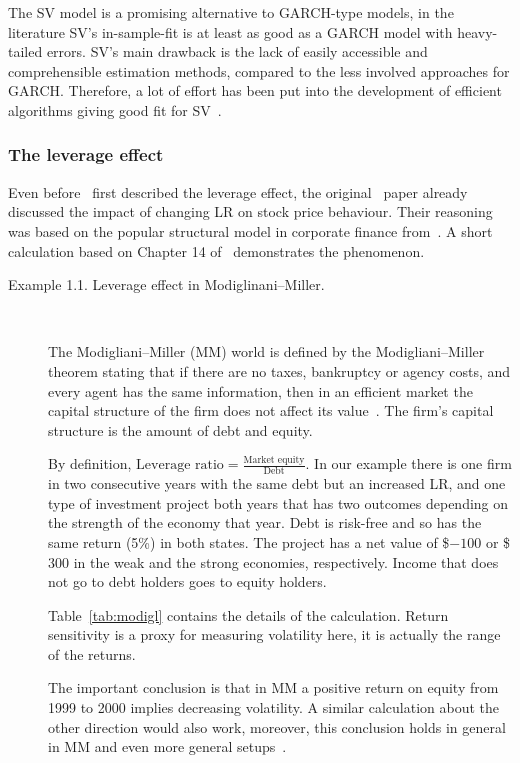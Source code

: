 The SV model is a promising alternative to GARCH-type models, in the literature SV's in-sample-fit is at least as good as a GARCH model with heavy-tailed errors.
SV's main drawback is the lack of easily accessible and comprehensible estimation methods, compared to the less involved approaches for GARCH.
Therefore, a lot of effort has been put into the development of efficient algorithms giving good fit for SV~\citep{Kim1998,jacquier2002bayesian,Omori2007,Kastner2014,Chan2016}.

\subsubsection*{The leverage effect}

Even before~\citet{black1976studies} first described the leverage effect, the original~\citet{black1973pricing} paper already discussed the impact of changing LR on stock price behaviour.
Their reasoning was based on the popular structural model in corporate finance from~\citet{modigliani1958cost}.
A short calculation based on Chapter 14 of~\citet{berk2007corporate} demonstrates the phenomenon.
\begin{description}
	\item[Example 1.1. Leverage effect in Modiglinani--Miller.]~
	
	The Modigliani--Miller (MM) world is defined by the Modigliani--Miller theorem stating that if there are no taxes, bankruptcy or agency costs, and every agent has the same information, then in an efficient market the capital structure of the firm does not affect its value~\citep{modigliani1958cost}.
	The firm's capital structure is the amount of debt and equity.
	
	By definition, $\text{Leverage ratio}=\frac{\text{Market equity}}{\text{Debt}}$. In our example there is one firm in two consecutive years with the same debt but an increased LR, and one type of investment project both years that has two outcomes depending on the strength of the economy that year.
	Debt is risk-free and so has the same return (5\%) in both states.
	The project has a net value of \$$-100$ or \$$300$ in the weak and the strong economies, respectively.
	Income that does not go to debt holders goes to equity holders.
	
	Table~\ref{tab:modigl} contains the details of the calculation. Return sensitivity is a proxy for measuring volatility here, it is actually the range of the returns.
	
	The important conclusion is that in MM a positive return on equity from 1999 to 2000 implies decreasing volatility.
	A similar calculation about the other direction would also work, moreover, this conclusion holds in general in MM and even more general setups~\citep{Christie1982}.
\end{description}

